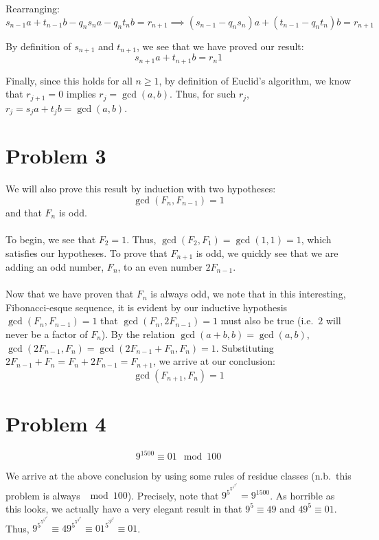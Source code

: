 \documentclass[letterpaper]{article}
\begin{document}
Rearranging:
$$ s_{n - 1}a + t_{n - 1}b - q_n s_n a - q_n t_n b = r_{n + 1} \implies (s_{n - 1} - q_n s_n)a + (t_{n - 1} - q_n t_n)b = r_{n + 1} $$

By definition of $ s_{n + 1} $ and $ t_{n + 1} $, we see that we have proved our result:
$$ s_{n + 1}a + t_{n + 1}b = r_{n } 1 $$

Finally, since this holds for all $ n \geq 1 $, by definition of Euclid's algorithm, we know that $ r_{ j + 1} = 0 $ implies $ r_j = \gcd(a, b) $. Thus, for such $ r_j $, $ r_j = s_j a + t_j b = \gcd(a, b) $.

\section{Problem 3}
\label{sec:Problem3}

We will also prove this result by induction with two hypotheses:
$$ \gcd(F_n, F_{n - 1}) = 1 $$ and that $ F_n $ is odd.
\\ \\
To begin, we see that $ F_2 = 1 $. Thus, $ \gcd(F_2, F_1) = \gcd(1, 1) = 1 $, which satisfies our hypotheses.
To prove that $ F_{n + 1} $ is odd, we quickly see that we are adding an odd number, $ F_n $, to an even number $ 2F_{n - 1} $.
\\ \\
Now that we have proven that $ F_n $ is always odd, we note that in this interesting, Fibonacci-esque sequence, it is evident by our inductive hypothesis $ \gcd(F_n, F_{n - 1}) = 1 $ that $ \gcd(F_n, 2F_{n - 1}) = 1 $ must also be true (i.e.\ $ 2 $ will never be a factor of $ F_n $).
By the relation $ \gcd(a + b, b) = \gcd(a, b) $, $ \gcd(2F_{n - 1}, F_n) = \gcd(2F_{n - 1} + F_n, F_n) = 1 $.
Substituting $ 2F_{n - 1} + F_n = F_n + 2F_{n - 1} = F_{n + 1} $, we arrive at our conclusion:
$$ \gcd(F_{n + 1}, F_n) = 1 $$

\section{Problem 4}
\label{sec:Problem4}

$$ 9^{1500} \equiv 01 \mod 100 $$

We arrive at the above conclusion by using some rules of residue classes (n.b.\ this problem is always $ \mod 100 $).
Precisely, note that $ 9^{5^{5^{5^{3^{2^2}}}}} = 9^{1500} $.
As horrible as this looks, we actually have a very elegant result in that $ 9^5 \equiv 49 $ and $ 49^5 \equiv 01 $.
Thus, $ 9^{5^{5^{5^{3^{2^2}}}}} \equiv 49^{5^{5^{3^{2^2}}}} \equiv 01^{5^{3^{2^2}}} \equiv 01 $.
\end{document}
